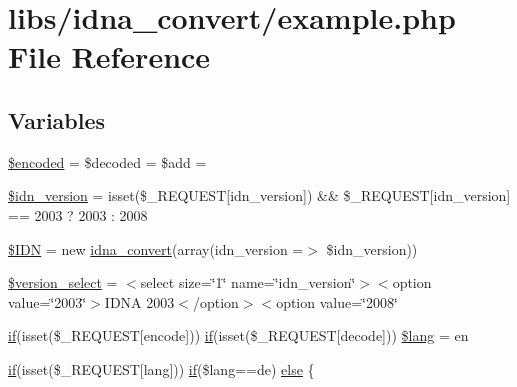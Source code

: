 \hypertarget{example_8php}{}\section{libs/idna\+\_\+convert/example.php File Reference}
\label{example_8php}
\subsection*{Variables}
\begin{DoxyCompactItemize}
\item 
\hyperlink{example_8php_af709b460501204e2ec7e34e96e7de576}{\$encoded} = \$decoded = \$add = \textquotesingle{}\textquotesingle{}
\item 
\hyperlink{example_8php_aaa64132973e10962c52265cfbee1cb9c}{\$idn\+\_\+version} = isset(\$\+\_\+\+R\+E\+Q\+U\+E\+ST\mbox{[}\textquotesingle{}idn\+\_\+version\textquotesingle{}\mbox{]}) \&\& \$\+\_\+\+R\+E\+Q\+U\+E\+ST\mbox{[}\textquotesingle{}idn\+\_\+version\textquotesingle{}\mbox{]} == 2003 ? 2003 \+: 2008
\item 
\hyperlink{example_8php_aa45ac61e5ada434ea385befcd1aea16d}{\$\+I\+DN} = new \hyperlink{classidna__convert}{idna\+\_\+convert}(array(\textquotesingle{}idn\+\_\+version\textquotesingle{} =$>$ \$idn\+\_\+version))
\item 
\hyperlink{example_8php_ab3c48763ff07220eb755d181fa8916cb}{\$version\+\_\+select} = \textquotesingle{}$<$select size=\char`\"{}1\char`\"{} name=\char`\"{}idn\+\_\+version\char`\"{}$>$$<$option value=\char`\"{}2003\char`\"{}$>$I\+D\+NA 2003$<$/option$>$$<$option value=\char`\"{}2008\char`\"{}\textquotesingle{}
\item 
\hyperlink{config_8inc_8php_a73b98c0274e28635a594091f9ca43cb4}{if}(isset(\$\+\_\+\+R\+E\+Q\+U\+E\+ST\mbox{[}\textquotesingle{}encode\textquotesingle{}\mbox{]})) \hyperlink{config_8inc_8php_a73b98c0274e28635a594091f9ca43cb4}{if}(isset(\$\+\_\+\+R\+E\+Q\+U\+E\+ST\mbox{[}\textquotesingle{}decode\textquotesingle{}\mbox{]})) \hyperlink{example_8php_a770b62b717ae588e5ed87bd3bbd165b4}{\$lang} = \textquotesingle{}en\textquotesingle{}
\item 
\hyperlink{config_8inc_8php_a73b98c0274e28635a594091f9ca43cb4}{if}(isset(\$\+\_\+\+R\+E\+Q\+U\+E\+ST\mbox{[}\textquotesingle{}lang\textquotesingle{}\mbox{]})) \hyperlink{config_8inc_8php_a73b98c0274e28635a594091f9ca43cb4}{if}(\$lang==\textquotesingle{}de\textquotesingle{}) \hyperlink{example_8php_a01fbb012a89302d84c18c2e82a15026a}{else} \{
\end{DoxyCompactItemize}


